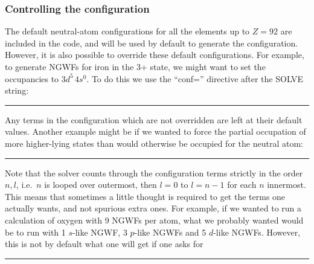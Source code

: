 \documentclass[letterpaper,10pt,english]{sphinxmanual}
\begin{document}
\subsubsection{Controlling the configuration}
\label{\detokenize{pseudoatomic_solver:controlling-the-configuration}}
The default neutral-atom configurations for all the elements up to
\(Z=92\) are included in the code, and will be used by default to
generate the configuration. However, it is also possible to override
these default configurations. For example, to generate NGWFs for iron in
the 3+ state, we might want to set the occupancies to
\(3d^{5}\,4s^{0}\). To do this we use the “conf=” directive after
the SOLVE string:


\bigskip\hrule\bigskip





Any terms in the configuration which are not overridden are left at
their default values. Another example might be if we wanted to force the
partial occupation of more higher-lying states than would otherwise be
occupied for the neutral atom:


\bigskip\hrule\bigskip





Note that the solver counts through the configuration terms strictly in
the order \(n,l\), i.e. \(n\) is looped over outermost, then
\(l=0\) to \(l=n-1\) for each \(n\) innermost. This means
that sometimes a little thought is required to get the terms one
actually wants, and not spurious extra ones. For example, if we wanted
to run a calculation of oxygen with 9 NGWFs per atom, what we probably
wanted would be to run with 1 \(s\)-like NGWF, 3 \(p\)-like
NGWFs and 5 \(d\)-like NGWFs. However, this is not by default what
one will get if one asks for


\bigskip\hrule\bigskip






\end{document}
